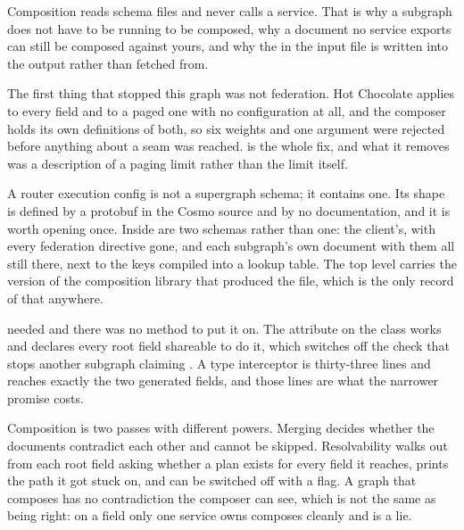 \begin{chaptersummary}
  \item Composition reads schema files and never calls a service. That is why
        a subgraph does not have to be running to be composed, why a document
        no service exports can still be composed against yours, and why the
         in the input file is written into the output rather
        than fetched from.
  \item The first thing that stopped this graph was not federation. Hot
        Chocolate applies  to every field and  to a
        paged one with no configuration at all, and the composer holds its own
        definitions of both, so six weights and one argument were rejected
        before anything about a seam was reached.
         is the whole fix, and what it removes
        was a description of a paging limit rather than the limit itself.
  \item A router execution config is not a supergraph schema; it contains one.
        Its shape is defined by a protobuf in the Cosmo source and by no
        documentation, and it is worth opening once. Inside 
        are two schemas rather than one: the client's, with every federation
        directive gone, and each subgraph's own document with them all still
        there, next to the keys compiled into a lookup table. The top level
        carries the version of the composition library that produced the file,
        which is the only record of that anywhere.
  \item {} needed  and there was no method to
        put it on. The attribute on the  class works and declares
        every root field shareable to do it, which switches off the check that
        stops another subgraph claiming . A type interceptor
        is thirty-three lines and reaches exactly the two generated fields,
        and those lines are what the narrower promise costs.
  \item Composition is two passes with different powers. Merging decides
        whether the documents contradict each other and cannot be skipped.
        Resolvability walks out from each root field asking whether a plan
        exists for every field it reaches, prints the path it got stuck on, and
        can be switched off with a flag. A graph that composes has no
        contradiction the composer can see, which is not the same as being
        right:  on a field only one service owns composes
        cleanly and is a lie.
\end{chaptersummary}
